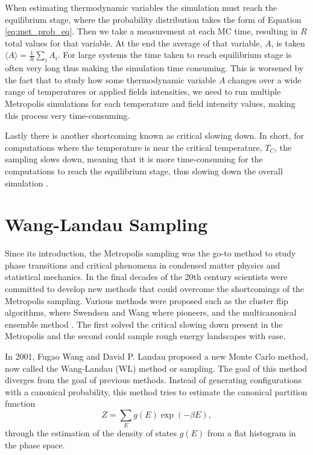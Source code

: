 When estimating thermodynamic variables the simulation must reach the equilibrium stage, where the probability distribution takes the form of Equation \ref{eq:met_prob_eq}. Then we take a measurement at  each MC time, resulting in $R$ total values for that variable. At the end the average of that variable, $A$, is taken $\langle A \rangle = \frac{1}{R} \sum_i A_i$. 
For large systems the time taken to reach equilibrium stage is often very long thus making the simulation time consuming. 
This is worsened by the fact that to study how some thermodynamic variable $A$ changes over a wide range of temperatures or applied fields intensities, we need to run multiple Metropolis simulations for each temperature and field intensity values, making this process very time-consuming.

Lastly there is another shortcoming known as critical slowing down. In short, for computations where the temperature is near the critical temperature, $T_C$, the sampling slows down, meaning that it is more time-consuming for the computations to reach the equilibrium stage, thus slowing down the overall simulation \cite{Landau_Book}.

\section{Wang-Landau Sampling}

Since its introduction, the Metropolis sampling was the go-to method to study phase transitions and critical phenomena in condensed matter physics and statistical mechanics. In the final decades of the 20th century scientists were committed to develop new methods that could overcome the shortcomings of the Metropolis sampling. Various methods were proposed such as the cluster flip algorithms, where Swendsen and Wang where pioneers, and the multicanonical ensemble method \cite{WL_Original}. The first solved the critical slowing down present in the Metropolis and the second could sample rough energy landscapes with ease. 

In 2001, Fugao Wang and David P. Landau \cite{WL_Original, WL_Edu} proposed a new Monte Carlo method, now called the Wang-Landau (WL) method or sampling. The goal of this method diverges from the goal of previous methods. Instead of generating configurations with a canonical probability, this method tries to estimate the canonical partition function
\begin{equation}
	Z = \sum_E g(E) \exp(-\beta E),
\end{equation}
through the estimation of the density of states $g(E)$ from a flat histogram in the phase space.

